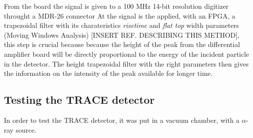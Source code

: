 From the board the signal is given to a 100 MHz 14-bit resolution digitizer throught a MDR-26 connector
At the signal is the applied, with an FPGA, a trapezoidal filter with its charateristics \emph{risetime} and \emph{flat top} width parameters (Moving Windows Analysis) [INSERT REF. DESCRIBING THIS METHOD], this step is crucial because because the height of the peak from the differential amplifier board will be directly proportional to the energy of the incident particle in the detector.
The height trapezoidal filter with the right parameters then gives the information on the intensity of the peak available for longer time.


\subsection{Testing the TRACE detector}

In order to test the TRACE detector, it was put in a vacuum chamber, with a $\alpha$-ray source.